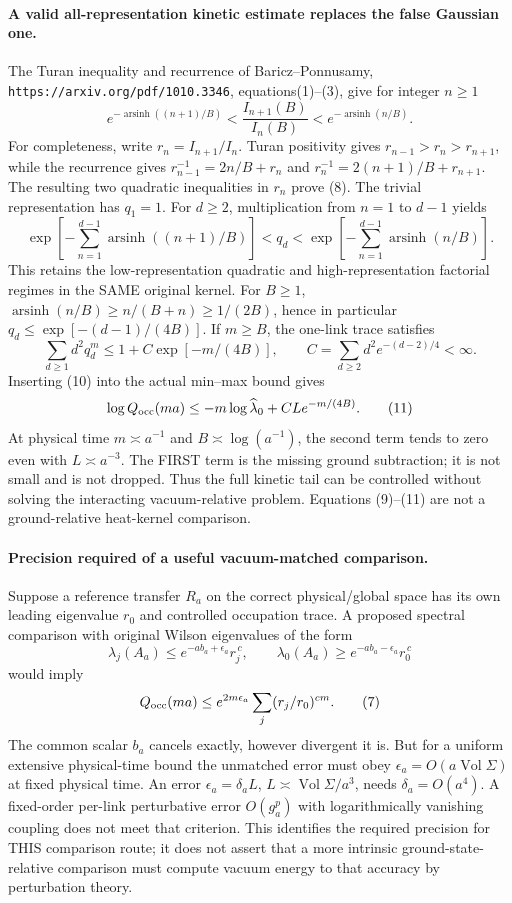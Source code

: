 \documentclass[11pt]{article}
\begin{document}
\paragraph{A valid all-representation kinetic estimate replaces the false Gaussian one.}
The Turan inequality and recurrence of Baricz--Ponnusamy,
\texttt{https://arxiv.org/pdf/1010.3346}, equations(1)--(3), give for integer $n\ge1$
\[
 e^{-\operatorname{arsinh}((n+1)/B)}
 <\frac{I_{n+1}(B)}{I_n(B)}
 < e^{-\operatorname{arsinh}(n/B)}.                     \tag{8}
\]
For completeness, write $r_n=I_{n+1}/I_n$. Turan positivity gives
$r_{n-1}>r_n>r_{n+1}$, while the recurrence gives
$r_{n-1}^{-1}=2n/B+r_n$ and $r_n^{-1}=2(n+1)/B+r_{n+1}$.
The resulting two quadratic inequalities in $r_n$ prove (8).
The trivial representation has $q_1=1$. For $d\ge2$, multiplication from $n=1$ to $d-1$ yields
\[
 \exp\left[-\sum_{n=1}^{d-1}\operatorname{arsinh}((n+1)/B)\right]
 <q_d<
 \exp\left[-\sum_{n=1}^{d-1}\operatorname{arsinh}(n/B)\right]. \tag{9}
\]
This retains the low-representation quadratic and high-representation factorial
regimes in the SAME original kernel. For $B\ge1$,
$\operatorname{arsinh}(n/B)\ge n/(B+n)\ge1/(2B)$, hence in particular
$q_d\le\exp[-(d-1)/(4B)]$. If $m\ge B$, the one-link trace satisfies
\[
 \sum_{d\ge1}d^2q_d^m\le1+C\exp[-m/(4B)],\qquad
 C=\sum_{d\ge2}d^2e^{-(d-2)/4}<\infty.                 \tag{10}
\]
Inserting (10) into the actual min--max bound gives
\[
 \log Q_{\rm occ}(ma)\le
       -m\log\widehat\lambda_0+C L e^{-m/(4B)}.        \tag{11}
\]
At physical time $m\asymp a^{-1}$ and $B\asymp\log(a^{-1})$, the second term
tends to zero even with $L\asymp a^{-3}$. The FIRST term is the missing ground
subtraction; it is not small and is not dropped. Thus the full kinetic tail can
be controlled without solving the interacting vacuum-relative problem. Equations
(9)--(11) are not a ground-relative heat-kernel comparison.

\paragraph{Precision required of a useful vacuum-matched comparison.}
Suppose a reference transfer $R_a$ on the correct physical/global space has its
own leading eigenvalue $r_0$ and controlled occupation trace. A proposed spectral
comparison with original Wilson eigenvalues of the form
\[
 \lambda_j(A_a)\le e^{-a b_a+\epsilon_a}r_j^{\,c},\qquad
 \lambda_0(A_a)\ge e^{-a b_a-\epsilon_a}r_0^{\,c}
\]
would imply
\[
 Q_{\rm occ}(ma)\le e^{2m\epsilon_a}
       \sum_j(r_j/r_0)^{cm}.                           \tag{7}
\]
The common scalar $b_a$ cancels exactly, however divergent it is. But for a uniform
extensive physical-time bound the unmatched error must obey
$\epsilon_a=O(a\operatorname{Vol}\Sigma)$ at fixed physical time. An error
$\epsilon_a=\delta_a L$, $L\asymp\operatorname{Vol}\Sigma/a^3$, needs
$\delta_a=O(a^4)$. A fixed-order per-link perturbative error $O(g_a^p)$ with
logarithmically vanishing coupling does not meet that criterion.
This identifies the required precision for THIS comparison route; it does not
assert that a more intrinsic ground-state-relative comparison must compute
vacuum energy to that accuracy by perturbation theory.
\end{document}
